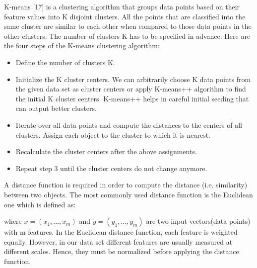 K-means [17] is a clustering algorithm that groups data points based on their feature values into K disjoint clusters. All the points that are classified into the same cluster are similar to each other when compared to those data points in the other clusters. The number of clusters K has to be specified in advance. Here are the four steps of the K-means clustering
algorithm:

\begin{itemize}
	\item Define the number of clusters K.
	
	\item Initialize the K cluster centers. We can arbitrarily choose K data points from the given data set as cluster centers or apply K-means++ \cite{arthur2007k} algorithm to find the initial K cluster centers. K-means++ helps in careful initial seeding that can output better clusters.
	
	\item Iterate over all data points and compute the distances to the centers of all clusters. Assign each object to the cluster to which it is nearest.
	
	\item Recalculate the cluster centers after the above assignments.
	
	\item Repeat step 3 until the cluster centers do not change anymore.
\end{itemize}

A distance function is required in order to compute the
distance (i.e. similarity) between two objects. The most commonly used distance function is the Euclidean one which is defined as:

\begin{center}
\end{center}
where $x = (x_1, ..., x_m)$ and $y = (y_1, ..., y_m)$ are two input vectors(data points) with m features. In the Euclidean distance function, each feature is weighted equally. However, in our data set different features are usually measured at different scales. Hence, they must be normalized before applying the distance function.